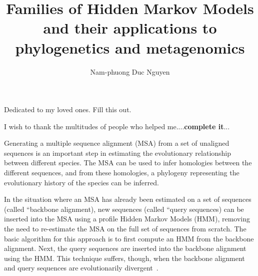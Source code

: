 \documentclass[12pt]{report}	%
\author{Nam-phuong Duc Nguyen}  	%
\title{Families of Hidden Markov Models and their applications to phylogenetics and metagenomics}
\theoremstyle{definition}
\theoremstyle{remark}
\begin{document}
\sloppy
\copyrightpage          %


%
%
%
\commcertpage           %

\titlepage              %



%
\begin{dedication}
%
Dedicated to my loved ones.  Fill this out.
\end{dedication}


\begin{acknowledgments}%
%
I wish to thank the multitudes of people who helped me....\textbf{complete it}...  
\end{acknowledgments}



\utabstract
{}%
\indent

Generating a multiple sequence alignment (MSA) from 
a set of unaligned sequences is an important step in
estimating the evolutionary relationship between
different species.  The MSA can be used to infer homologies
between the different sequences, and from these homologies,
a phylogeny representing the evolutionary history of the species can be inferred.

In the situation where an MSA has
already been estimated on a set of sequences (called ``backbone alignment), new sequences (called ``query sequences) can be inserted into the MSA using a profile Hidden Markov Models (HMM), removing the need to re-estimate the MSA on the full set of sequences from scratch.  The basic algorithm for this approach is to first compute an HMM from the backbone alignment.  Next, the query sequences are inserted into the backbone alignment using the HMM.  This technique suffers, though, when the backbone alignment and query sequences are evolutionarily divergent~\cite{Mirarab2012}.  
\end{document}
